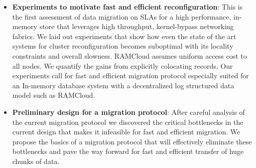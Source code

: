 \begin{itemize}
  \item{\textbf{Experiments to motivate fast and efficient reconfiguration}}: This is the first assessment of data migration on SLAs for a high performance,
    in-memory store that leverages high throughput, kernel-bypass networking fabrics. 
   We laid out experiments that show how even the state of the art systems for cluster reconfiguration becomes suboptimal with its locality constraints and overall slowness. 
   RAMCloud assumes uniform access cost to all nodes. We quantify the gains from explicitly colocating records.
   Our experiments call for fast and efficient migration protocol especially suited for an In-memory database system with a decentralized log structured data model such as RAMCloud.

  \item{\textbf{Preliminary design for a migration protocol}}: After careful analysis of the current migration protocol
   we discovered the critical bottlenecks in the current design that makes it infeasible for fast and efficient migration.
   We propose the basics of a migration protocol that will effectively eliminate these bottlenecks and pave the way
   forward for fast and efficient transfer of huge chunks of data.

\end{itemize}

